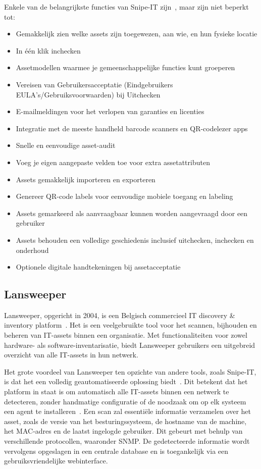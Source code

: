 Enkele van de belangrijkste functies van Snipe-IT zijn~\autocite{snipe-it-features}, maar zijn niet beperkt tot:
\begin{itemize}
    \item Gemakkelijk zien welke assets zijn toegewezen, aan wie, en hun fysieke locatie
    \item In één klik inchecken
    \item Assetmodellen waarmee je gemeenschappelijke functies kunt groeperen
    \item Vereisen van Gebruikersacceptatie (Eindgebruikers EULA's/Gebruiksvoorwaarden) bij Uitchecken
    \item E-mailmeldingen voor het verlopen van garanties en licenties
    \item Integratie met de meeste handheld barcode scanners en QR-codelezer apps
    \item Snelle en eenvoudige asset-audit
    \item Voeg je eigen aangepaste velden toe voor extra assetattributen
    \item Assets gemakkelijk importeren en exporteren
    \item Genereer QR-code labels voor eenvoudige mobiele toegang en labeling
    \item Assets gemarkeerd als aanvraagbaar kunnen worden aangevraagd door een gebruiker
    \item Assets behouden een volledige geschiedenis inclusief uitchecken, inchecken en onderhoud
    \item Optionele digitale handtekeningen bij assetacceptatie
\end{itemize}

\subsection{Lansweeper}
\label{sub:lansweeper}

Lansweeper, opgericht in 2004, is een Belgisch commercieel IT discovery \& inventory platform~\autocite{lansweeper-history}.
Het is een veelgebruikte tool voor het scannen, bijhouden en beheren van IT-assets binnen een organisatie.
Met functionaliteiten voor zowel hardware- als software-inventarisatie, biedt Lansweeper gebruikers een uitgebreid overzicht van alle IT-assets in hun netwerk.

Het grote voordeel van Lansweeper ten opzichte van andere tools, zoals Snipe-IT, is dat het een volledig geautomatiseerde oplossing biedt~\autocite{lansweeper-features}.
Dit betekent dat het platform in staat is om automatisch alle IT-assets binnen een netwerk te detecteren, zonder handmatige configuratie of de noodzaak om op elk systeem een agent te installeren~\autocite{lansweeper-getting-started}.
Een scan zal essenti\"ele informatie verzamelen over het asset, zoals de versie van het besturingssysteem, de hostname van de machine, het MAC-adres en de laatst ingelogde gebruiker.
Dit gebeurt met behulp van verschillende protocollen, waaronder SNMP.
De gedetecteerde informatie wordt vervolgens opgeslagen in een centrale database en is toegankelijk via een gebruiksvriendelijke webinterface.

